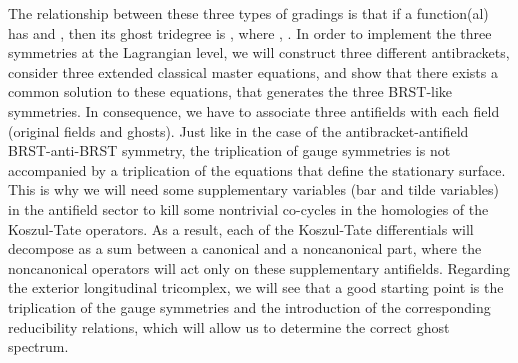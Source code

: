 \documentclass[a4paper,12pt]{article}
\begin{document}
The relationship between these three types of gradings is that if a
function(al) \coordHE{} has \coordHE{} and \coordHE{}, then its
ghost tridegree is \coordHE{}, where \coordHE{}, \coordHE{}. In order to implement the three symmetries \coordHE{} at the Lagrangian level, we will construct
three different antibrackets, consider three extended classical master
equations, and show that there exists a common solution \coordHE{} to these
equations, that generates the three BRST-like symmetries. In consequence, we
have to associate three antifields with each field (original fields and
ghosts). Just like in the case of the antibracket-antifield BRST-anti-BRST
symmetry, the triplication of gauge symmetries is not accompanied by a
triplication of the equations that define the stationary surface. This is
why we will need some supplementary variables (bar and tilde variables) in
the antifield sector to kill some nontrivial co-cycles in the homologies of
the Koszul-Tate operators. As a result, each of the Koszul-Tate
differentials will decompose as a sum between a canonical and a noncanonical
part, where the noncanonical operators will act only on these supplementary
antifields. Regarding the exterior longitudinal tricomplex, we will see that
a good starting point is the triplication of the gauge symmetries and the
introduction of the corresponding reducibility relations, which will allow
us to determine the correct ghost spectrum.
\end{document}
